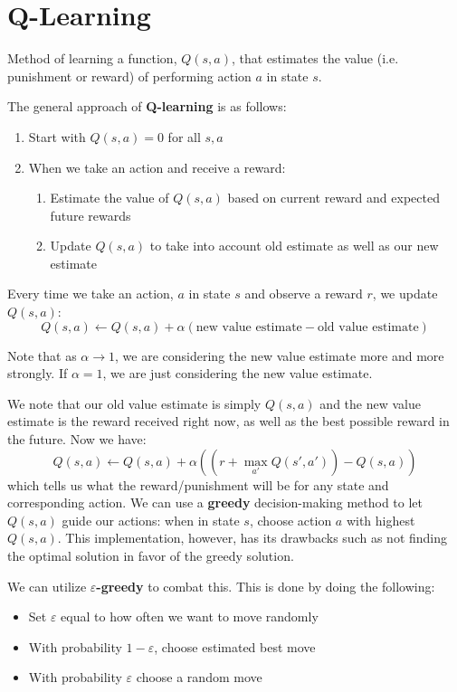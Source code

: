\section{Q-Learning}
\begin{definition}[Q-Learning]
	Method of learning a function, \(Q(s,a)\), that estimates the value (i.e. punishment or reward) of performing action \(a\) in state \(s\).
\end{definition}

The general approach of \textbf{Q-learning} is as follows:
\begin{enumerate}
	\item Start with \(Q(s,a)=0\) for all \(s,a\)
	\item When we take an action and receive a reward:
		\begin{enumerate}
			\item Estimate the value of \(Q(s,a)\) based on current reward and expected future rewards
			\item Update \(Q(s,a)\) to take into account old estimate as well as our new estimate
		\end{enumerate}
\end{enumerate}

Every time we take an action, \(a\) in state \(s\) and observe a reward \(r\), we update \(Q(s,a)\):
\[
	Q(s,a) \gets Q(s,a) + \alpha (\text{new value estimate} - \text{old value estimate})
\]
\begin{remark}
	Note that as \(\alpha \to 1\), we are considering the new value estimate more and more strongly. If \(\alpha =1\), we are just considering the new value estimate. 
\end{remark}

We note that our old value estimate is simply \(Q(s,a)\) and the new value estimate is the reward received right now, as well as the best possible reward in the future. Now we have:
\[
	Q(s,a) \gets Q(s,a)+\alpha ((r+\max_{a'}Q(s',a'))-Q(s,a))
\]
which tells us what the reward/punishment will be for any state and corresponding action. We can use a \textbf{greedy} decision-making method to let \(Q(s,a)\) guide our actions: when in state \(s\), choose action \(a\) with highest \(Q(s,a)\). This implementation, however, has its drawbacks such as not finding the optimal solution in favor of the greedy solution. \par

We can utilize \textbf{\(\varepsilon\)-greedy}  to combat this. This is done by doing the following:
\begin{itemize}
	\item Set \(\varepsilon\) equal to how often we want to move randomly
	\item With probability \(1-\varepsilon \), choose estimated best move
	\item With probability \(\varepsilon \)  choose a random move
\end{itemize}